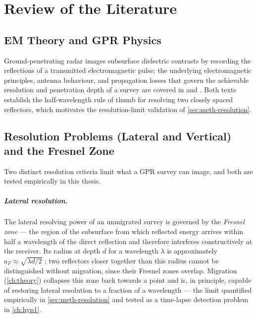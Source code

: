 \chapter{Review of the Literature}
\label{ch:litreview}


\section{EM Theory and GPR Physics}

Ground-penetrating radar images subsurface dielectric contrasts by recording
the reflections of a transmitted electromagnetic pulse; the underlying
electromagnetic principles, antenna behaviour, and propagation losses that
govern the achievable resolution and penetration depth of a survey are
covered in \citet{annan2009} and \citet{daniels2004}. Both texts establish
the half-wavelength rule of thumb for resolving two closely spaced
reflectors, which motivates the resolution-limit validation of
\cref{sec:meth-resolution}.

\section{Resolution Problems (Lateral and Vertical) and the Fresnel Zone}
\label{sec:lit-resolution}

Two distinct resolution criteria limit what a GPR survey can image, and both
are tested empirically in this thesis.

\paragraph{Lateral resolution.} The lateral resolving power of an unmigrated
survey is governed by the \emph{Fresnel zone} --- the region of the
subsurface from which reflected energy arrives within half a wavelength of
the direct reflection and therefore interferes constructively at the
receiver. Its radius at depth $d$ for a wavelength $\lambda$ is
approximately $a_F \approx \sqrt{\lambda d/2}$ \citep{annan2009}; two
reflectors closer together than this radius cannot be distinguished without
migration, since their Fresnel zones overlap. Migration (\cref{ch:theory})
collapses this zone back towards a point and is, in principle, capable of
restoring lateral resolution to a fraction of a wavelength --- the limit
quantified empirically in \cref{sec:meth-resolution} and tested as a
time-lapse detection problem in \cref{ch:hyp1}.

